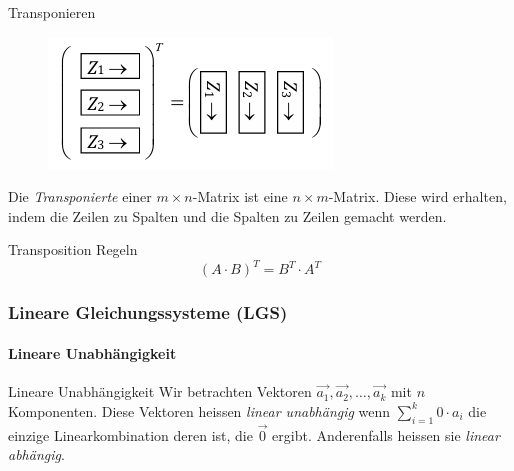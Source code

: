     \begin{definition}{Transponieren}
        \begin{figure}
            \vspace{-13pt}
            \includegraphics[width=0.9\linewidth]{mat-transpos.png}
        \end{figure}
        Die \textit{Transponierte} einer $m\times n$-Matrix ist eine $n\times m$-Matrix. 
        Diese wird erhalten, indem die Zeilen zu Spalten und die Spalten zu Zeilen gemacht werden.
    \end{definition}

    \begin{theorem}{Transposition Regeln}
        \begin{equation*}
            {(A\cdot B)}^T = B^T\cdot A^T
        \end{equation*}
    \end{theorem}




\subsubsection*{Lineare Gleichungssysteme (LGS)}

\paragraph{Lineare Unabhängigkeit}
    \begin{definition}{Lineare Unabhängigkeit}
        Wir betrachten Vektoren $\vec{a_1},\vec{a_2},\ldots,\vec{a_k}$ mit $n$ Komponenten.
        Diese Vektoren heissen \textit{linear unabhängig} wenn $\sum_{i=1}^k 0\cdot a_i$ die
        einzige Linearkombination deren ist, die $\vec{0}$ ergibt. 
        Anderenfalls heissen sie \textit{linear abhängig}.
    \end{definition}

